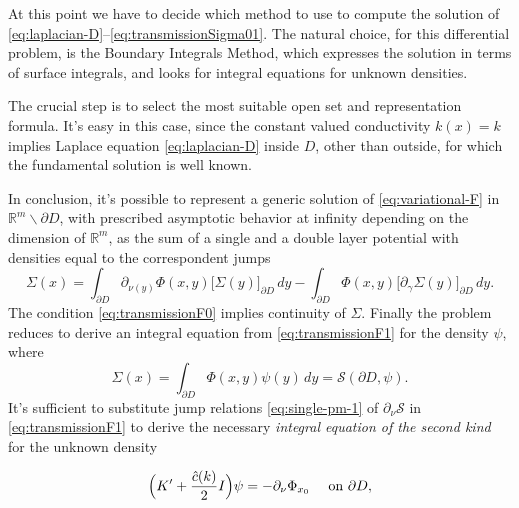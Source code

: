 \documentclass[10pt, a4paper, twoside, openright]{book}
\theoremstyle{definition}
\theoremstyle{plain}
\theoremstyle{plain}
\theoremstyle{plain}
\theoremstyle{plain}
\theoremstyle{plain}
\theoremstyle{plain}
\theoremstyle{plain}
\theoremstyle{plain}
\begin{document}
At this point we have to decide which method to use to compute the solution of \eqref{eq:laplacian-D}--\eqref{eq:transmissionSigma01}. The natural choice, for this differential problem, is the Boundary Integrals Method, 
which expresses the solution in terms of surface integrals, and looks for integral equations for unknown densities. 
\par
The crucial step is to select the most suitable open set and representation formula. It's easy in this case, since the constant valued conductivity $k(x)=k$ implies Laplace equation \eqref{eq:laplacian-D} inside $D$, other than outside, for which the fundamental solution is well known.
\par
In conclusion, it's possible to represent a generic solution of \eqref{eq:variational-F} 
in $\mathbb{R}^m\backslash\partial D$, with prescribed asymptotic behavior at infinity depending on the dimension of $\mathbb{R}^m$, as the sum of a single and a double layer potential with densities equal to the correspondent jumps 
\begin{equation}
 \Sigma(x) = \int_{\partial D}\partial_{\nu(y)}\Phi(x,y)\bigl[\Sigma(y)\bigr]_{\partial D}\,dy-\int_{\partial D}\Phi(x,y)\bigl[\partial_\gamma \Sigma(y)\bigr]_{\partial D}\,dy.
\end{equation}
The condition \eqref{eq:transmissionF0} implies continuity of $\Sigma$. Finally the problem reduces to derive an integral equation from \eqref{eq:transmissionF1} for the density $\psi$, where
\begin{equation}
 \Sigma(x)=\int_{\partial D}\Phi(x,y)\psi(y)\,dy = \mathcal{S}(\partial D, \psi).
\end{equation}
It's sufficient to substitute jump relations \eqref{eq:single-pm-1} of $\partial_\nu\mathcal{S}$ in \eqref{eq:transmissionF1} to derive the necessary \emph{integral equation of the second kind} for the unknown density
\begin{center}
\begin{equation}
 \label{eq:eq-psi-ck}
 \Bigl(K' + \frac{\hat{c}(k)}{2} I\Bigr)\psi = -\partial_\nu \Phi_{x_0}\quad\textup{ on }\partial D,
\end{equation}
\end{center}
\end{document}
